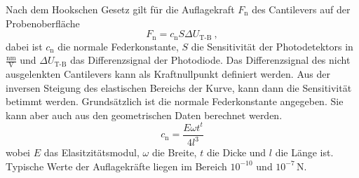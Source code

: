 Nach dem Hookschen Gesetz gilt für die Auflagekraft $F_\text{n}$ des Cantilevers auf der Probenoberfläche
$$F_\text{n}=c_\text{n}S\Delta U_\text{T-B}~,$$
dabei ist $c_\text{n}$ die normale Federkonstante, $S$ die Sensitivität der Photodetektors in $\frac{\text{nm}}{\text{V}}$ und $\Delta U_\text{T-B}$ das Differenzsignal der Photodiode. Das Differenzsignal des nicht ausgelenkten Cantilevers kann als Kraftnullpunkt definiert werden. Aus der inversen Steigung des elastischen Bereichs der Kurve, kann dann die Sensitivität betimmt werden. Grundsätzlich ist die normale Federkonstante angegeben. Sie kann aber auch aus den geometrischen Daten berechnet werden.
$$c_\text{n}=\frac{E\omega t^{t}}{4l^{3}}$$
wobei $E$ das Elasitzitätsmodul, $\omega$ die Breite, $t$ die Dicke und $l$ die Länge ist. Typische Werte der Auflagekräfte liegen im Bereich $10^{-10}$ und $10^{-7}\,$N.
